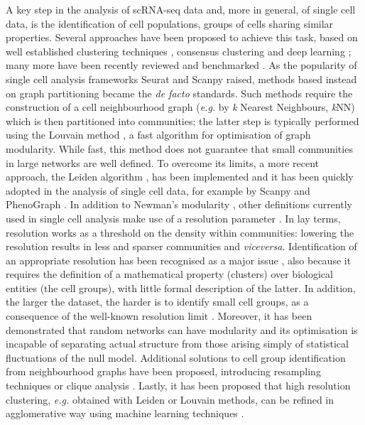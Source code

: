 \documentclass[10pt,letterpaper]{article}
\begin{document}
A key step in the analysis of scRNA-seq data and, more in general, of single cell data, is the identification of cell populations, groups of cells sharing similar properties. Several approaches have been proposed to achieve this task, based on well established clustering techniques \cite{wang_2017, lin_2017}, consensus clustering \cite{huh_2020, kiselev_2017} and deep learning \cite{li_2020}; many more have been recently reviewed \cite{krzak_2019, kiselev_2019} and benchmarked \cite{du_2018}. As the popularity of single cell analysis frameworks Seurat \cite{butler_2018} and Scanpy \cite{wolf_2018} raised, methods based instead on graph partitioning became the \emph{de facto} standards. Such methods require the construction of a cell neighbourhood graph (\emph{e.g.} by \emph{k }Nearest Neighbours, \emph{k}NN) which is then partitioned into communities; the latter step is typically performed using the Louvain method \cite{blondel_2008}, a fast algorithm for optimisation of graph modularity. While fast, this method does not guarantee that small communities in large networks are well defined. To overcome its limits, a more recent approach, the Leiden algorithm \cite{traag_2019}, has been implemented and it has been quickly adopted in the analysis of single cell data, for example by Scanpy and PhenoGraph \cite{levine_2015}. In addition to Newman's modularity \cite{newman_2004}, other definitions currently used in single cell analysis make use of a resolution parameter \cite{traag_2011, reichardt_2006} . In lay terms, resolution works as a threshold on the density within communities: lowering the resolution results in less and sparser communities and \emph{viceversa}. Identification of an appropriate resolution has been recognised as a major issue \cite{lhnemann_2020}, also because it requires the definition of a mathematical property (clusters) over biological entities (the cell groups), with little formal description of the latter. In addition, the larger the dataset, the harder is to identify small cell groups, as a consequence of the well-known resolution limit \cite{fortunato_2007}. Moreover, it has been demonstrated that random networks can have modularity \cite{guimer_2004} and its optimisation is incapable of separating actual structure from those arising simply of statistical fluctuations of the null model. Additional solutions to cell group identification from neighbourhood graphs have been proposed, introducing resampling techniques \cite{baran_2019} or clique analysis \cite{xu_2015}. Lastly, it has been proposed that high resolution clustering, \emph{e.g.} obtained with Leiden or Louvain methods, can be refined in agglomerative way using machine learning techniques \cite{miao_2020}.
\end{document}
